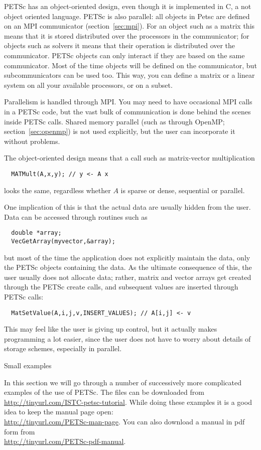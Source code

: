 PETSc has an object-oriented design, even though it is implemented in
C, a not object oriented language. PETSc is also parallel: all objects
in Petsc are defined on an MPI communicator
(section~\ref{sec:mpi}). For an object such as a matrix this means
that it is stored distributed over the processors in the communicator;
for objects such as solvers it means that their operation is
distributed over the communicator.  PETSc objects can only interact if
they are based on the same communicator.  Most of the time objects
will be defined on the  communicator, but
subcommunicators can be used too. This way, you can define a matrix or
a linear system on all your available processors, or on a subset.

Parallelism is handled through MPI. You may need to have occasional
MPI calls in a PETSc code, but the vast bulk of communication is done
behind the scenes inside PETSc calls. Shared memory parallel (such as
through OpenMP; section~\ref{sec:openmp}) is not used explicitly, but
the user can incorporate it without problems.

The object-oriented design means that a call such as matrix-vector
multiplication
\begin{verbatim}
  MATMult(A,x,y); // y <- A x
\end{verbatim}
looks the same, regardless whether $A$ is sparse or dense, sequential
or parallel.

One implication of this is that the actual data are usually hidden from
the user. Data can be accessed through routines such as
\begin{verbatim}
  double *array;
  VecGetArray(myvector,&array); 
\end{verbatim}
but most of the time the application does not explicitly maintain the
data, only the PETSc objects containing the data. As the ultimate consequence
of this, the user usually does not allocate data; rather, matrix and vector
arrays get created through the PETSc create calls, and subsequent
values are inserted through PETSc calls:
\begin{verbatim}
  MatSetValue(A,i,j,v,INSERT_VALUES); // A[i,j] <- v
\end{verbatim}
This may feel like the user is giving up control, but it actually
makes programming a lot easier, since the user does not have to worry
about details of storage schemes, especially in parallel.

 {Small examples}

In this section we will go through a number of successively more
complicated examples of the use of PETSc. The files can be downloaded
from\\
\url{http://tinyurl.com/ISTC-petsc-tutorial}. While doing these
examples it is a good idea to keep the manual page open:\\
\url{http://tinyurl.com/PETSc-man-page}. You can also download a
manual in pdf form from\\
\url{http://tinyurl.com/PETSc-pdf-manual}.


